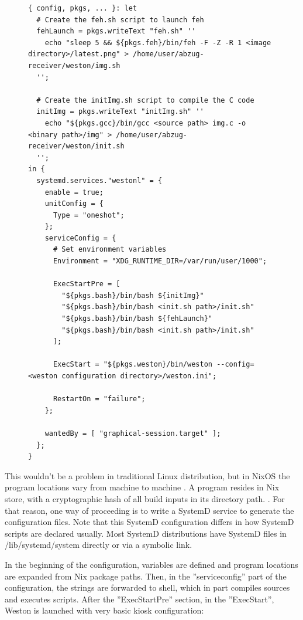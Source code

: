 \begin{figure}[H]
\begin{lstlisting} 
{ config, pkgs, ... }: let
  # Create the feh.sh script to launch feh
  fehLaunch = pkgs.writeText "feh.sh" ''
    echo "sleep 5 && ${pkgs.feh}/bin/feh -F -Z -R 1 <image directory>/latest.png" > /home/user/abzug-receiver/weston/img.sh
  '';

  # Create the initImg.sh script to compile the C code
  initImg = pkgs.writeText "initImg.sh" ''
    echo "${pkgs.gcc}/bin/gcc <source path> img.c -o <binary path>/img" > /home/user/abzug-receiver/weston/init.sh
  '';
in {
  systemd.services."westonl" = {
    enable = true;
    unitConfig = {
      Type = "oneshot";
    };
    serviceConfig = {
      # Set environment variables
      Environment = "XDG_RUNTIME_DIR=/var/run/user/1000";

      ExecStartPre = [
        "${pkgs.bash}/bin/bash ${initImg}"
        "${pkgs.bash}/bin/bash <init.sh path>/init.sh"
        "${pkgs.bash}/bin/bash ${fehLaunch}"
        "${pkgs.bash}/bin/bash <init.sh path>/init.sh"
      ];

      ExecStart = "${pkgs.weston}/bin/weston --config=<weston configuration directory>/weston.ini";

      RestartOn = "failure";
    };

    wantedBy = [ "graphical-session.target" ];
  };
}
\end{lstlisting}
\label{systemd1}
\end{figure}

This wouldn't be a problem in traditional Linux distribution, but in
NixOS the program locations vary from machine to machine
\cite{dolstra2010nixos}. A program resides in Nix store, with a
cryptographic hash of all build inputs in its directory
path. \cite{dolstra2010nixos}. For that reason, one way of proceeding
is to write a SystemD service to generate the configuration
files. Note that this SystemD configuration differs in how SystemD
scripts are declared usually. Most SystemD distributions have SystemD
files in /lib/systemd/system directly or via a symbolic link.

In the beginning of the configuration, variables are defined and
program locations are expanded from Nix package paths. Then, in the
''serviceconfig'' part of the configuration, the strings are forwarded
to shell, which in part compiles sources and executes scripts. After
the ''ExecStartPre'' section, in the ''ExecStart'', Weston is launched
with very basic kiosk configuration:

